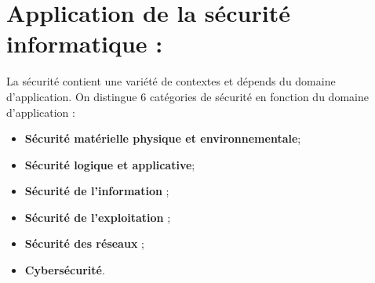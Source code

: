 \section{Application de la sécurité informatique : }
La sécurité contient une variété de contextes et dépends du domaine d’application. On distingue 6 catégories de sécurité en fonction du domaine d’application  :
\begin{itemize}[label=\textbullet]
\item \textbf{Sécurité matérielle physique et environnementale};
\item \textbf{Sécurité logique et applicative};
\item \textbf{Sécurité de l’information} ;
\item \textbf{Sécurité de l’exploitation} ;
\item \textbf{Sécurité des réseaux };
\item \textbf{Cybersécurité}.
\end{itemize}
\imageAPS

